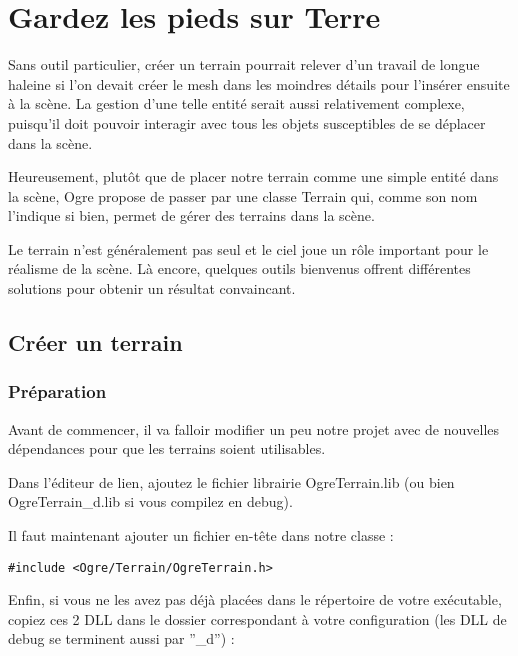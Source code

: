 
\chapter{Gardez les pieds sur Terre}
Sans outil particulier, cr\'eer un terrain pourrait relever d'un travail de longue haleine si l'on devait cr\'eer le mesh dans les moindres d\'etails pour l'ins\'erer ensuite \`a la sc\`ene. La gestion d'une telle entit\'e serait aussi relativement complexe, puisqu'il doit pouvoir interagir avec tous les objets susceptibles de se d\'eplacer dans la sc\`ene.

Heureusement, plut\^ot que de placer notre terrain comme une simple entit\'e dans la sc\`ene, Ogre propose de passer par une classe Terrain qui, comme son nom l'indique si bien, permet de g\'erer des terrains dans la sc\`ene.

Le terrain n'est g\'en\'eralement pas seul et le ciel joue un r\^ole important pour le r\'ealisme de la sc\`ene. L\`a encore, quelques outils bienvenus offrent diff\'erentes solutions pour obtenir un r\'esultat convaincant.



\section{Cr\'eer un terrain}


\subsection{Pr\'eparation}

Avant de commencer, il va falloir modifier un peu notre projet avec de nouvelles d\'ependances pour que les terrains soient utilisables.

Dans l'\'editeur de lien, ajoutez le fichier librairie OgreTerrain.lib (ou bien OgreTerrain\_d.lib si vous compilez en debug).

Il faut maintenant ajouter un fichier en-t\^ete dans notre classe :

\begin{lstlisting}[caption={Ajout du fichier d'ent\^ete pour la gestion des terrains}]
#include <Ogre/Terrain/OgreTerrain.h>
\end{lstlisting}

Enfin, si vous ne les avez pas d\'ej\`a plac\'ees dans le r\'epertoire de votre ex\'ecutable, copiez ces 2 DLL dans le dossier correspondant \`a votre configuration (les DLL de debug se terminent aussi par ''\_d'') :

